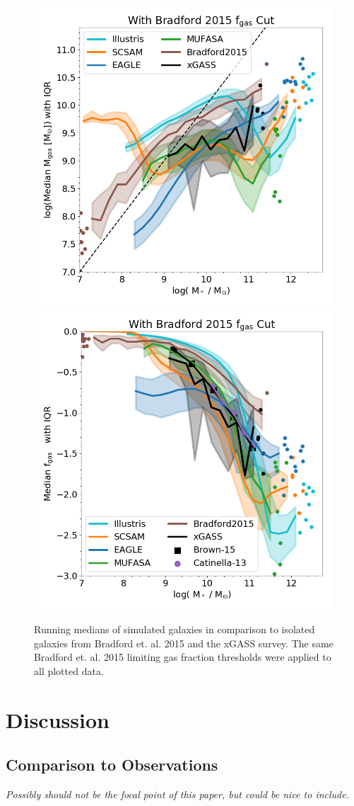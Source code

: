 \documentclass[fleqn,usenatbib]{mnras}
\begin{document}
\begin{figure}
\includegraphics[width = 0.49\linewidth]{MHI_Mstar_binned_IQR_bradford_fgas_cut}
\includegraphics[width=0.49\linewidth]{fgas_mstar_binned_IQR_logged_bradford_fgas_cut.png}
\caption{Running medians of simulated galaxies in comparison to isolated galaxies from Bradford et. al. 2015 and the xGASS survey. The same Bradford et. al. 2015 limiting gas fraction thresholds were applied to all plotted data.}
\label{fig:fgas DSFMS panel}
\end{figure}

\section{Discussion}

\subsection{Comparison to Observations}
\label{sec:observations}
{\it Possibly should not be the focal point of this paper, but could be nice to include. } 
\end{document}

